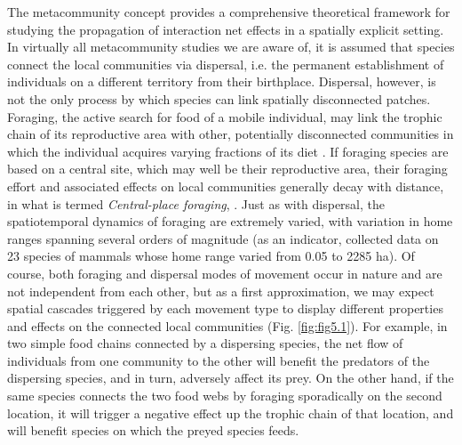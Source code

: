 The metacommunity concept \citep{Leibold2018} provides a comprehensive theoretical framework for studying the propagation of interaction net effects in a spatially explicit setting. In virtually all metacommunity studies we are aware of, it is assumed that species connect the local communities via dispersal, i.e. the permanent establishment of individuals on a different territory from their birthplace. Dispersal, however, is not the only process by which species can link spatially disconnected patches. Foraging, the active search for food of a mobile individual, may link the trophic chain of its reproductive area with other, potentially disconnected communities in which the individual acquires varying fractions of its diet \citep{McCann2005}. If foraging species are based on a central site, which may well be their reproductive area, their foraging effort and associated effects on local communities generally decay with distance, in what is termed \textit{Central-place foraging}, \citep{Orians1979}. Just as with dispersal, the spatiotemporal dynamics of foraging are extremely varied, with variation in home ranges spanning several orders of magnitude (as an indicator, \citealt{Swihart1988} collected data on 23 species of mammals whose home range varied from 0.05 to 2285 ha). Of course, both foraging and dispersal modes of movement occur in nature and are not independent from each other, but as a first approximation, we may expect spatial cascades triggered by each movement type to display different properties and effects on the connected local communities (Fig. \ref{fig:fig5.1}). For example, in two simple food chains connected by a dispersing species, the net flow of individuals from one community to the other will benefit the predators of the dispersing species, and in turn, adversely affect its prey. On the other hand, if the same species connects the two food webs by foraging sporadically on the second location, it will trigger a negative effect up the trophic chain of that location, and will benefit species on which the preyed species feeds.


